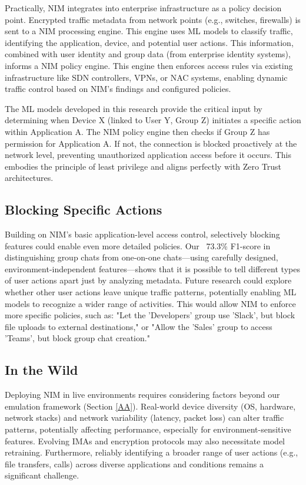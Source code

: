 \documentclass[conference]{IEEEtran}
\begin{document}
Practically, NIM integrates into enterprise infrastructure as a policy decision point. Encrypted traffic metadata from network points (e.g., switches, firewalls) is sent to a NIM processing engine. This engine uses ML models to classify traffic, identifying the application, device, and potential user actions. This information, combined with user identity and group data (from enterprise identity systems), informs a NIM policy engine. This engine then enforces access rules via existing infrastructure like SDN controllers, VPNs, or NAC systems, enabling dynamic traffic control based on NIM's findings and configured policies.

The ML models developed in this research provide the critical input by determining when Device X (linked to User Y, Group Z) initiates a specific action within Application A. The NIM policy engine then checks if Group Z has permission for Application A. If not, the connection is blocked proactively at the network level, preventing unauthorized application access before it occurs. This embodies the principle of least privilege and aligns perfectly with Zero Trust architectures.

\subsection{Blocking Specific Actions}
Building on NIM's basic application-level access control, selectively blocking features could enable even more detailed policies. Our ~73.3\% F1-score in distinguishing group chats from one-on-one chats—using carefully designed, environment-independent features—shows that it is possible to tell different types of user actions apart just by analyzing metadata. Future research could explore whether other user actions leave unique traffic patterns, potentially enabling ML models to recognize a wider range of activities. This would allow NIM to enforce more specific policies, such as: "Let the 'Developers' group use 'Slack', but block file uploads to external destinations," or "Allow the 'Sales' group to access 'Teams', but block group chat creation."

\subsection{In the Wild}
Deploying NIM in live environments requires considering factors beyond our emulation framework (Section \ref{AA}). Real-world device diversity (OS, hardware, network stacks) and network variability (latency, packet loss) can alter traffic patterns, potentially affecting performance, especially for environment-sensitive features. Evolving IMAs and encryption protocols may also necessitate model retraining. Furthermore, reliably identifying a broader range of user actions (e.g., file transfers, calls) across diverse applications and conditions remains a significant challenge.
\end{document}
